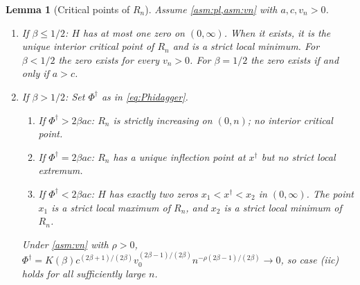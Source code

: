 \documentclass[11pt]{article}
\theoremstyle{plain}
\newtheorem{lemma}[theorem]{Lemma}
\theoremstyle{definition}
\theoremstyle{remark}
\begin{document}
\begin{lemma}[Critical points of $R_n$]\label{lem:critical}
Assume \cref{asm:pl,asm:vn} with $a,c,v_n>0$.
\begin{enumerate}[label=\rm(\roman*),leftmargin=*]
\item If $\beta\le1/2$: $H$ has at most one zero on $(0,\infty)$. When it exists, it is the unique interior critical point of $R_n$ and is a strict local minimum. For $\beta<1/2$ the zero exists for every $v_n>0$. For $\beta=1/2$ the zero exists if and only if $a>c$.
\item If $\beta>1/2$: Set $\Phi^\dagger$ as in \cref{eq:Phidagger}.
\begin{enumerate}[label=\rm(\alph*),leftmargin=*]
\item If $\Phi^\dagger>2\beta ac$: $R_n$ is strictly increasing on $(0,n)$; no interior critical point.
\item If $\Phi^\dagger=2\beta ac$: $R_n$ has a unique inflection point at $x^\dagger$ but no strict local extremum.
\item If $\Phi^\dagger<2\beta ac$: $H$ has exactly two zeros $x_1<x^\dagger<x_2$ in $(0,\infty)$. The point $x_1$ is a strict local maximum of $R_n$, and $x_2$ is a strict local minimum of $R_n$.
\end{enumerate}
Under \cref{asm:vn} with $\rho>0$, $\Phi^\dagger=K(\beta)c^{(2\beta+1)/(2\beta)}v_0^{(2\beta-1)/(2\beta)}n^{-\rho(2\beta-1)/(2\beta)}\to0$, so case \rm{(iic)} holds for all sufficiently large $n$.
\end{enumerate}
\end{lemma}
\end{document}

